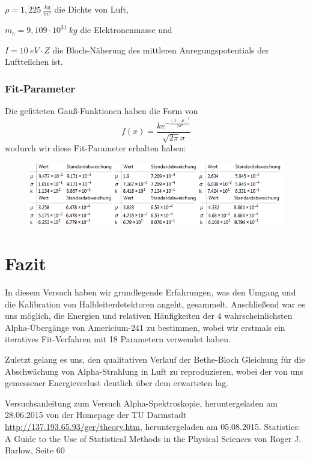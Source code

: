 \documentclass[bigchapter,colorback,accentcolor=tud4b,linedtoc,11pt]{tudreport}
\begin{document}
$\rho = 1,225~ \frac{kg}{m^3}$ die Dichte von Luft,

$m_e = 9,109 \cdot 10^{31}~ kg$ die Elektronenmasse und

$I = 10~ eV \cdot Z$ die Bloch-Näherung des mittleren Anregungspotentials der Luftteilchen ist.

\subsection{Fit-Parameter}
Die gefitteten Gauß-Funktionen haben die Form von 
$$f(x)=\frac{k e^{-\frac{(x-\mu )^2}{2 \sigma ^2}}}{\sqrt{2 \pi } \sigma }$$
wodurch wir diese Fit-Parameter erhalten haben:
\begin{figure}[H]
\centering
    \includegraphics[scale=1]{img/air-gauss-fits.png}
\end{figure}

\chapter{Fazit}
In diesem Versuch haben wir grundlegende Erfahrungen, was den Umgang und die
Kalibration von Halbleiterdetektoren angeht, gesammelt. Anschließend war es uns
möglich, die Energien und relativen Häufigkeiten der 4 wahrscheinlichsten Alpha-Übergänge von
Americium-241 zu bestimmen, wobei wir erstmals ein iteratives Fit-Verfahren mit
18 Parametern verwendet haben.

Zuletzt gelang es uns, den qualitativen Verlauf der Bethe-Bloch Gleichung für
die Abschwächung von Alpha-Strahlung in Luft zu reproduzieren, wobei der von uns
gemessener Energieverlust deutlich über dem erwarteten lag.
\cleardoublepage{}
\newpage
\begin{thebibliography}{100}
   Versuchsanleitung zum Versuch Alpha-Spektroskopie, heruntergeladen am 28.06.2015 von der Homepage der TU Darmstadt
  \url{http://137.193.65.93/ger/theory.htm}, heruntergeladen am 05.08.2015.
   Statistics: A Guide to the Use of Statistical Methods in the
    Physical Sciences von Roger J. Barlow, Seite 60
\end{thebibliography}
\end{document}
